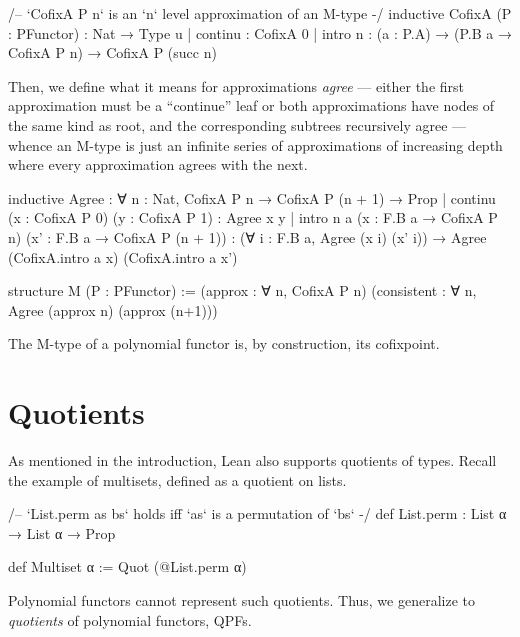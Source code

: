 \begin{leancode}
  /-- `CofixA P n` is an `n` level approximation of an M-type -/
  inductive CofixA (P : PFunctor) : Nat → Type u
  | continu : CofixA 0
  | intro {n} : (a : P.A) → (P.B a → CofixA P n) → CofixA P (succ n)
\end{leancode}

Then, we define what it means for approximations \emph{agree} --- either the first approximation must be a ``continue'' leaf or both approximations have nodes of the same kind as root, and the corresponding subtrees recursively agree --- whence an M-type is just an infinite series of approximations of increasing depth where every approximation agrees with the next.

\begin{leancode}
  inductive Agree : ∀ {n : Nat}, CofixA P n → CofixA P (n + 1) → Prop
  | continu (x : CofixA P 0) (y : CofixA P 1) : Agree x y
  | intro {n} {a}   (x  : F.B a → CofixA P n) 
                    (x' : F.B a → CofixA P (n + 1)) 
                    : (∀ i : F.B a, Agree (x i) (x' i))
                    → Agree (CofixA.intro a x) (CofixA.intro a x')

  structure M (P : PFunctor) := 
    (approx : ∀ n, CofixA P n)
    (consistent : ∀ n, Agree (approx n) (approx (n+1)))
\end{leancode}

The M-type of a polynomial functor is, by construction, its cofixpoint.

\section{Quotients}
As mentioned in the introduction, Lean also supports quotients of types.
Recall the example of multisets, defined as a quotient on lists.

\begin{leancode}
    /-- `List.perm as bs` holds iff `as` is a permutation of `bs` -/
    def List.perm : List α → List α → Prop

    def Multiset α := Quot (@List.perm α)
\end{leancode}

Polynomial functors cannot represent such quotients. Thus, we generalize to \emph{quotients} of polynomial functors, QPFs.

